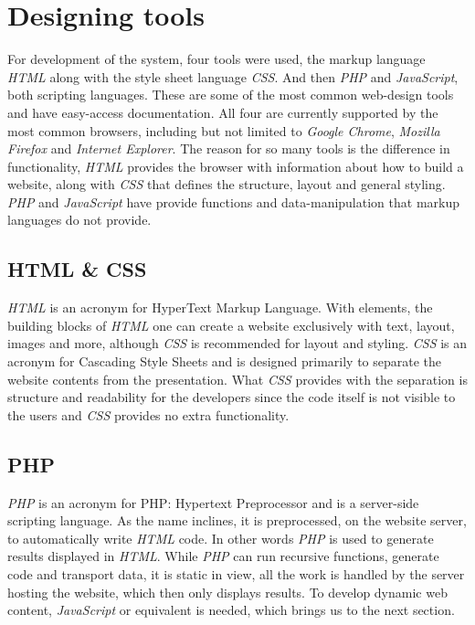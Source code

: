 \section{Designing tools}
For development of the system, four tools were used, the markup language \textit{HTML} along with the style sheet language \textit{CSS}. And then \textit{PHP} and \textit{JavaScript}, both scripting languages. These are some of the most common web-design tools and have easy-access documentation. All four are currently supported by the most common browsers, including but not limited to \textit{Google Chrome}, \textit{Mozilla Firefox} and \textit{Internet Explorer}.
The reason for so many tools is the difference in functionality, \textit{HTML} provides the browser with information about how to build a website, along with \textit{CSS} that defines the structure, layout and general styling. \textit{PHP} and \textit{JavaScript} have provide functions and data-manipulation that markup languages do not provide.
\cite{html}\cite{css}\cite{php}\cite{javascript}

\subsection{HTML & CSS}
\textit{HTML} is an acronym for HyperText Markup Language. With elements, the building blocks of \textit{HTML} one can create a website exclusively with text, layout, images and more, although \textit{CSS} is recommended for layout and styling. \textit{CSS} is an acronym for Cascading Style Sheets and is designed primarily to separate the website contents from the presentation.
What \textit{CSS} provides with the separation is structure and readability for the developers since the code itself is not visible to the users and \textit{CSS} provides no extra functionality.\cite{html}\cite{css}

\subsection{PHP}
\textit{PHP} is an acronym for PHP: Hypertext Preprocessor and is a server-side scripting language. As the name inclines, it is preprocessed, on the website server, to automatically write \textit{HTML} code. In other words \textit{PHP} is used to generate results displayed in \textit{HTML}. While \textit{PHP} can run recursive functions, generate code and transport data, it is static in view, all the work is handled by the server hosting the website, which then only displays results. To develop dynamic web content, \textit{JavaScript} or equivalent is needed, which brings us to the next section.\cite{php}

